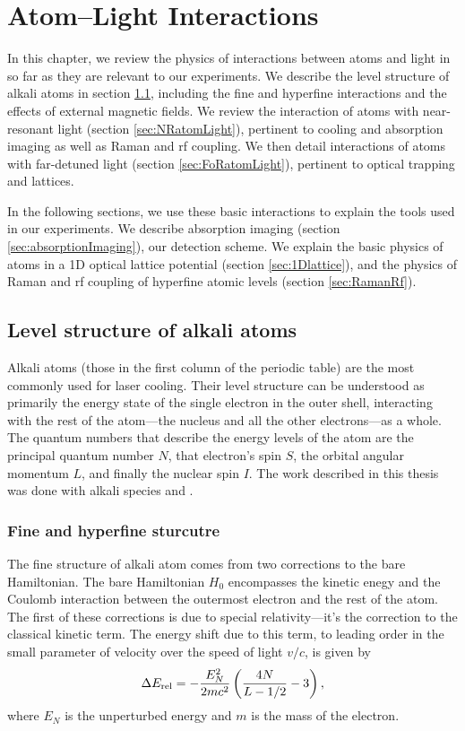 \renewcommand{\thechapter}{2}

\chapter{Atom--Light Interactions}
In this chapter, we review the physics of interactions between atoms and light in so far as they are relevant to our experiments. We describe the level structure of alkali atoms in section \ref{sec:atomicStructure}, including the fine and hyperfine interactions and the effects of external magnetic fields. We review the interaction of atoms with near-resonant light (section \ref{sec:NRatomLight}), pertinent to cooling and absorption imaging as well as Raman and rf coupling. We then detail interactions of atoms with far-detuned light (section \ref{sec:FoRatomLight}), pertinent to optical trapping and lattices. 

In the following sections, we use these basic interactions to explain the tools used in our experiments. We describe absorption imaging (section \ref{sec:absorptionImaging}), our detection scheme. We explain the basic physics of atoms in a 1D optical lattice potential (section \ref{sec:1Dlattice}), and the physics of Raman and rf coupling of hyperfine atomic levels (section \ref{sec:RamanRf}). 


\section{Level structure of alkali atoms}\label{sec:atomicStructure}

Alkali atoms (those in the first column of the periodic table) are the most commonly used for laser cooling. Their level structure can be understood as primarily the energy state of the single electron in the outer shell, interacting with the rest of the atom---the nucleus and all the other electrons---as a whole. The quantum numbers that describe the energy levels of the atom are the principal quantum number $N$, that electron's spin $S$, the orbital angular momentum $L$, and finally the nuclear spin $I$. The work described in this thesis was done with alkali species \Rb{} and \K{}.

\subsection{Fine and hyperfine sturcutre}\label{sec:hyperfine}

The fine structure of alkali atom comes from two corrections to the bare Hamiltonian. The bare Hamiltonian $H_0$ encompasses the kinetic enegy and the Coulomb interaction between the outermost electron and the rest of the atom. The first of these corrections is due to special relativity---it's the correction to the classical kinetic term. The energy shift due to this term, to leading order in the small parameter of velocity over the speed of light $v/c$, is given by\cite{Griffiths}
\begin{equation}
\Delta E_{\rm rel} = -\frac{E_N^2}{2mc^2}\left(\frac{4N}{L-1/2}-3\right),
\end{equation}
where $E_N$ is the unperturbed energy and $m$ is the mass of the electron. 

